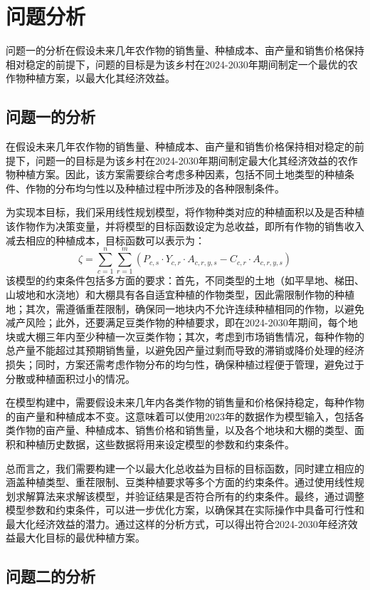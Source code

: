 \documentclass[withoutpreface]{cumcmthesis}
\begin{document}
\section{问题分析}
问题一的分析在假设未来几年农作物的销售量、种植成本、亩产量和销售价格保持相对稳定的前提下，问题的目标是为该乡村在2024-2030年期间制定一个最优的农作物种植方案，以最大化其经济效益。
\subsection{问题一的分析}
在假设未来几年农作物的销售量、种植成本、亩产量和销售价格保持相对稳定的前提下，问题一的目标是为该乡村在2024-2030年期间制定最大化其经济效益的农作物种植方案。因此，该方案需要综合考虑多种因素，包括不同土地类型的种植条件、作物的分布均匀性以及种植过程中所涉及的各种限制条件。

为实现本目标，我们采用线性规划模型，将作物种类对应的种植面积以及是否种植该作物作为决策变量，并将模型的目标函数设定为总收益，即所有作物的销售收入减去相应的种植成本，目标函数可以表示为：
\begin{equation}
    \zeta = \sum_{c=1}^{n} \sum_{r=1}^{m} (P_{c,s} \cdot Y_{c,r} \cdot A_{c,r,y,s} - C_{c,r} \cdot A_{c,r,y,s})
\end{equation}
该模型的约束条件包括多方面的要求：首先，不同类型的土地（如平旱地、梯田、山坡地和水浇地）和大棚具有各自适宜种植的作物类型，因此需限制作物的种植地；其次，需遵循重茬限制，确保同一地块内不允许连续种植相同的作物，以避免减产风险；此外，还要满足豆类作物的种植要求，即在2024-2030年期间，每个地块或大棚三年内至少种植一次豆类作物；其次，考虑到市场销售情况，每种作物的总产量不能超过其预期销售量，以避免因产量过剩而导致的滞销或降价处理的经济损失；同时，方案还需考虑作物分布的均匀性，确保种植过程便于管理，避免过于分散或种植面积过小的情况。

在模型构建中，需要假设未来几年内各类作物的销售量和价格保持稳定，每种作物的亩产量和种植成本不变。这意味着可以使用2023年的数据作为模型输入，包括各类作物的亩产量、种植成本、销售价格和销售量，以及各个地块和大棚的类型、面积和种植历史数据，这些数据将用来设定模型的参数和约束条件。

总而言之，我们需要构建一个以最大化总收益为目标的目标函数，同时建立相应的涵盖种植类型、重茬限制、豆类种植要求等多个方面的约束条件。通过使用线性规划求解算法来求解该模型，并验证结果是否符合所有的约束条件。最终，通过调整模型参数和约束条件，可以进一步优化方案，以确保其在实际操作中具备可行性和最大化经济效益的潜力。通过这样的分析方式，可以得出符合2024-2030年经济效益最大化目标的最优种植方案。

\subsection{问题二的分析}
\end{document}

